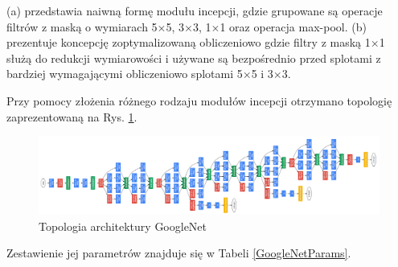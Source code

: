 (a) przedstawia naiwną formę modułu incepcji, gdzie grupowane są operacje filtrów z maską o wymiarach 5$\times$5, 3$\times$3, 1$\times$1 oraz operacja max-pool. (b) prezentuje koncepcję zoptymalizowaną obliczeniowo gdzie filtry z maską 1$\times$1 służą do redukcji wymiarowości i używane są bezpośrednio przed splotami z bardziej wymagającymi obliczeniowo splotami 5$\times$5 i 3$\times$3. 

Przy pomocy złożenia różnego rodzaju modułów incepcji otrzymano topologię zaprezentowaną na Rys. \ref{GoogleNetTopo}.
\begin{figure}[h!]
	\centering
	\includegraphics[width=1\textwidth]{figures/GoogleNet.png}
	\caption{Topologia architektury GoogleNet}
	\label{GoogleNetTopo}
\end{figure}
Zestawienie jej parametrów znajduje się w Tabeli \ref{GoogleNetParams}.

